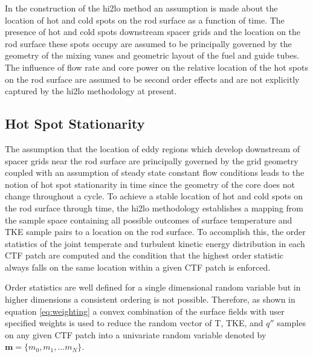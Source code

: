 In the construction of the hi2lo method an assumption is made about the location of hot and cold spots on the rod surface as a function of time.   The presence of hot and cold spots downstream spacer grids and the location on the rod surface these spots occupy are assumed to be principally governed by the geometry of the mixing vanes and geometric layout of the fuel and guide tubes.  The influence of flow rate and core power on the relative location of the hot spots on the rod surface are assumed to be second order effects and are not explicitly captured by the hi2lo methodology at present.

\subsection{Hot Spot Stationarity}
\label{sec:hot_spot_stat}

The assumption that the location of eddy regions which develop downstream of spacer grids near the rod surface are principally governed by the grid geometry coupled with an assumption of steady state constant flow conditions leads to the notion of hot spot stationarity in time since the geometry of the core does not change throughout a cycle.  To achieve a stable location of hot and cold spots on the rod surface through time, the hi2lo methodology establishes a mapping from the sample space containing all possible outcomes of surface temperature and TKE sample pairs to a location on the rod surface.  To accomplish this, the order statistics of the joint temperate and turbulent kinetic energy distribution in each CTF patch are computed and the condition that the highest order statistic always falls on the same location within a given CTF patch is enforced.

Order statistics are well defined for a single dimensional random variable but in higher dimensions a consistent ordering is not possible.  Therefore, as shown in equation \ref{eq:weighting} a convex combination of the surface fields with user specified weights is used to reduce the random vector of T, TKE, and $q''$ samples on any given CTF patch into a univariate random variable denoted by $\mathbf{m}=\{m_0, m_1, ... m_N\}$.

